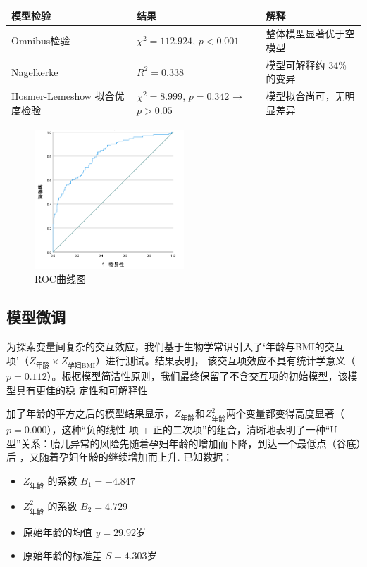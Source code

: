 \documentclass[withoutpreface,notoc]{cumcmthesis}
\begin{document}
	\begin{table}[!ht]
		\centering
		\begin{tabular}{|l|l|l|}
		\hline
			模型检验 & 结果 & 解释 \\ \hline
			Omnibus检验 & $\chi^2 = 112.924$, $p < 0.001$ & 整体模型显著优于空模型 \\ \hline
			Nagelkerke & $R^2 = 0.338$ & 模型可解释约 34\% 的变异 \\ \hline
			Hosmer-Lemeshow 拟合优度检验 & $\chi^2 = 8.999$, $p = 0.342$ → $p > 0.05$ & 模型拟合尚可，无明显差异\\ \hline
		\end{tabular}
	\end{table}


	\begin{figure}[ht]
		\centering
		\includegraphics[width=0.5\textwidth]{figures/ROC曲线.png} 
		\caption{ROC曲线图}
		\label{ROC曲线}
	\end{figure}


	
	





	\subsection{模型微调}

	为探索变量间复杂的交互效应，我们基于生物学常识引入了‘年龄与BMI的交互项’（$Z_{\text{年龄}} \times Z_{\text{孕妇BMI}}$）进行测试。结果表明，
	该交互项效应不具有统计学意义（$p=0.112$）。根据模型简洁性原则，我们最终保留了不含交互项的初始模型，该模型具有更佳的稳
	定性和可解释性

	加了年龄的平方之后的模型结果显示，$Z_{\text{年龄}}$和$Z^{2}_{\text{年龄}}$两个变量都变得高度显著（$p=0.000$），这种“负的线性
	项 + 正的二次项”的组合，清晰地表明了一种“U型”关系：胎儿异常的风险先随着孕妇年龄的增加而下降，到达一个最低点（谷底）后
	，又随着孕妇年龄的继续增加而上升.
	已知数据：
	\begin{itemize}
		\item 	$Z_{\text{年龄}} $ 的系数  $B_{1} = -4.847$
		\item 	$Z^{2}_{\text{年龄}}$ 的系数 $B_{2} = 4.729$
		\item 	原始年龄的均值 $\bar{y} = 29.92 $岁
		\item 	原始年龄的标准差 $S = 4.303 $岁
	\end{itemize}
\end{document}
